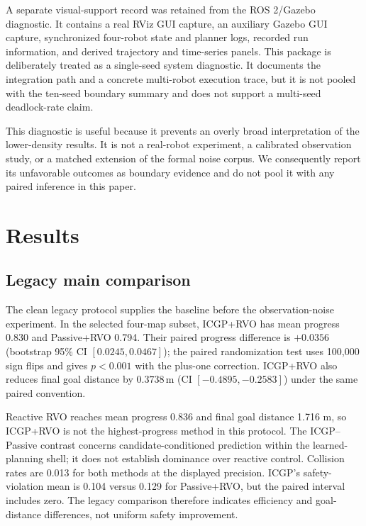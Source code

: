 \documentclass[pdflatex,sn-mathphys-num]{sn-jnl}
\begin{document}
A separate visual-support record was retained from the ROS 2/Gazebo diagnostic. It contains a real RViz GUI capture, an auxiliary Gazebo GUI capture, synchronized four-robot state and planner logs, recorded run information, and derived trajectory and time-series panels. This package is deliberately treated as a single-seed system diagnostic. It documents the integration path and a concrete multi-robot execution trace, but it is not pooled with the ten-seed boundary summary and does not support a multi-seed deadlock-rate claim.

This diagnostic is useful because it prevents an overly broad interpretation of the lower-density results. It is not a real-robot experiment, a calibrated observation study, or a matched extension of the formal noise corpus. We consequently report its unfavorable outcomes as boundary evidence and do not pool it with any paired inference in this paper.

\section{Results}
\label{sec:results}

\subsection{Legacy main comparison}

The clean legacy protocol supplies the baseline before the observation-noise experiment. In the selected four-map subset, ICGP+RVO has mean progress 0.830 and Passive+RVO 0.794. Their paired progress difference is $+0.0356$ (bootstrap 95\% CI $[0.0245,0.0467]$); the paired randomization test uses 100,000 sign flips and gives $p<0.001$ with the plus-one correction. ICGP+RVO also reduces final goal distance by $0.3738\,\mathrm{m}$ (CI $[-0.4895,-0.2583]$) under the same paired convention.

Reactive RVO reaches mean progress 0.836 and final goal distance 1.716 m, so ICGP+RVO is not the highest-progress method in this protocol. The ICGP--Passive contrast concerns candidate-conditioned prediction within the learned-planning shell; it does not establish dominance over reactive control. Collision rates are 0.013 for both methods at the displayed precision. ICGP's safety-violation mean is 0.104 versus 0.129 for Passive+RVO, but the paired interval includes zero. The legacy comparison therefore indicates efficiency and goal-distance differences, not uniform safety improvement.
\end{document}
